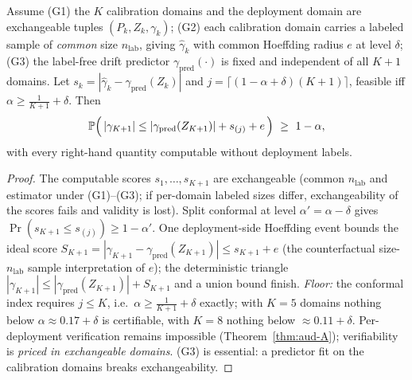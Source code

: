 \begin{theorem}\label{thm:aud-G}
Assume \textup{(G1)} the $K$ calibration domains and the deployment domain are exchangeable
tuples $(P_k,Z_k,\gamma_k)$; \textup{(G2)} each calibration domain carries a labeled sample of
\emph{common} size $n_{\mathrm{lab}}$, giving $\widehat\gamma_k$ with common Hoeffding radius
$e$ at level $\delta$; \textup{(G3)} the label-free drift predictor
$\gamma_{\mathrm{pred}}(\cdot)$ is fixed and independent of all $K{+}1$ domains. Let
$s_k=|\widehat\gamma_k-\gamma_{\mathrm{pred}}(Z_k)|$ and
$j=\lceil(1-\alpha+\delta)(K+1)\rceil$, feasible iff $\alpha\ge\tfrac1{K+1}+\delta$. Then
\[
\Pr\Bigl(\,|\gamma_{K+1}|\le|\gamma_{\mathrm{pred}}(Z_{K+1})|+s_{(j)}+e\,\Bigr)\ \ge\ 1-\alpha ,
\]
with every right-hand quantity computable without deployment labels.
\end{theorem}
\begin{proof}
The computable scores $s_1,\dots,s_{K+1}$ are exchangeable (common $n_{\mathrm{lab}}$ and
estimator under (G1)--(G3); if per-domain labeled sizes differ, exchangeability of the scores
fails and validity is lost). Split conformal at level $\alpha'=\alpha-\delta$ gives
$\Pr(s_{K+1}\le s_{(j)})\ge1-\alpha'$. One deployment-side Hoeffding event bounds the ideal
score $S_{K+1}=|\gamma_{K+1}-\gamma_{\mathrm{pred}}(Z_{K+1})|\le s_{K+1}+e$ (the counterfactual
size-$n_{\mathrm{lab}}$ sample interpretation of $e$); the deterministic triangle
$|\gamma_{K+1}|\le|\gamma_{\mathrm{pred}}(Z_{K+1})|+S_{K+1}$ and a union bound finish.
\emph{Floor:} the conformal index requires $j\le K$, i.e.\ $\alpha\ge\tfrac1{K+1}+\delta$
exactly; with $K=5$ domains nothing below $\alpha\approx0.17{+}\delta$ is certifiable, with
$K=8$ nothing below $\approx0.11{+}\delta$. Per-deployment verification remains impossible
(Theorem~\ref{thm:aud-A}); verifiability is \emph{priced in exchangeable domains}. (G3) is
essential: a predictor fit on the calibration domains breaks exchangeability.
\end{proof}

